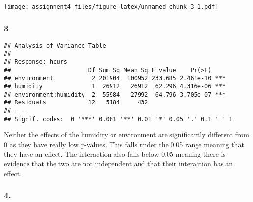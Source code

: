 \documentclass[11pt,]{article}
\newenvironment{Shaded}{\begin{snugshade}}{\end{snugshade}}
\newcommand{\KeywordTok}[1]{\textcolor[rgb]{0.13,0.29,0.53}{\textbf{{#1}}}}
\newcommand{\DataTypeTok}[1]{\textcolor[rgb]{0.13,0.29,0.53}{{#1}}}
\newcommand{\CommentTok}[1]{\textcolor[rgb]{0.56,0.35,0.01}{\textit{{#1}}}}
\newcommand{\NormalTok}[1]{{#1}}
\begin{document}
\texttt{[image: assignment4\_files/figure-latex/unnamed-chunk-3-1.pdf]}

\subsubsection{3}\label{section-2}

\begin{Shaded}
\end{Shaded}

\begin{verbatim}
## Analysis of Variance Table
## 
## Response: hours
##                      Df Sum Sq Mean Sq F value    Pr(>F)    
## environment           2 201904  100952 233.685 2.461e-10 ***
## humidity              1  26912   26912  62.296 4.316e-06 ***
## environment:humidity  2  55984   27992  64.796 3.705e-07 ***
## Residuals            12   5184     432                      
## ---
## Signif. codes:  0 '***' 0.001 '**' 0.01 '*' 0.05 '.' 0.1 ' ' 1
\end{verbatim}

Neither the effects of the humidity or environment are significantly
different from 0 as they have really low p-values. This falls under the
0.05 range meaning that they have an effect. The interaction also falls
below 0.05 meaning there is evidence that the two are not independent
and that their interaction has an effect.

\subsubsection{4.}\label{section-3}

\begin{Shaded}
\end{Shaded}
\end{document}
